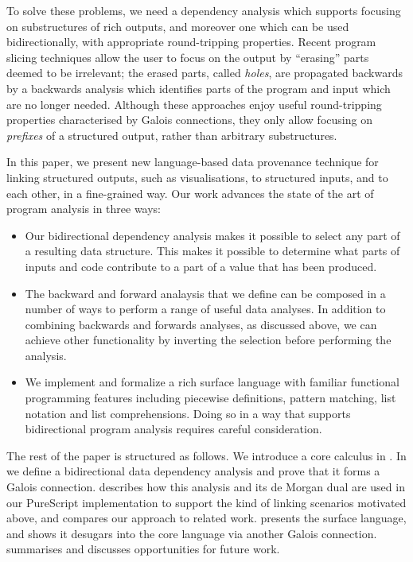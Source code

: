 To solve these problems, we need a dependency analysis which supports focusing on substructures of rich outputs, and moreover one which can be used bidirectionally, with appropriate round-tripping properties. Recent program slicing techniques \cite{perera12a,perera13a,ricciotti17} allow the user to focus on the output by ``erasing'' parts deemed to be irrelevant; the erased parts, called \emph{holes}, are propagated backwards by a backwards analysis which identifies parts of the program and input which are no longer needed. Although these approaches enjoy useful round-tripping properties characterised by Galois connections, they only allow focusing on \emph{prefixes} of a structured output, rather than arbitrary substructures.

In this paper, we present new language-based data provenance technique for linking structured outputs, such as visualisations, to structured inputs, and to each other, in a fine-grained way. Our work advances the state of the art  of program analysis in three ways:

\begin{itemize}
\item Our bidirectional dependency analysis makes it possible to select any part of a resulting data structure. This makes it possible to determine what parts of inputs and code contribute to a part of a value that has been produced.
\item The backward and forward analaysis that we define can be composed in a number of ways to perform a range of useful data analyses. In addition to combining backwards and forwards analyses, as discussed above, we can achieve other functionality by inverting the selection before performing the analysis.
\item We implement and formalize a rich surface language with familiar functional programming features including piecewise definitions, pattern matching, list notation and list comprehensions. Doing so in a way that supports bidirectional program analysis requires careful consideration.
\end{itemize}

\noindent The rest of the paper is structured as follows. We introduce a core calculus in . In  we define a bidirectional data dependency analysis and prove that it forms a Galois connection.  describes how this analysis and its de Morgan dual are used in our PureScript implementation to support the kind of linking scenarios motivated above, and compares our approach to related work.  presents the surface language, and shows it desugars into the core language via another Galois connection.  summarises and discusses opportunities for future work.

